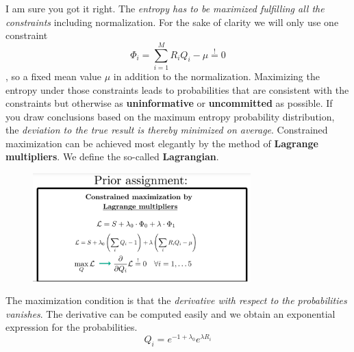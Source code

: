 \documentclass[12pt, a4paper]{scrartcl}
\begin{document}
I am sure you got it right. The \textit{entropy has to be maximized fulﬁlling
all the constraints} including normalization. For the sake of clarity we
will only use one constraint \[\Phi_i=\sum_{i=1}^MR_iQ_i-\mu\stackrel{!}{=}0\], so a fixed mean value $\mu$ in addition to the normalization. 
Maximizing the entropy under those constraints leads to probabilities
that are consistent with the constraints but otherwise as \textbf{uninformative} or
\textbf{uncommitted} as possible. If you draw conclusions based on the maximum
entropy probability distribution, the \textit{deviation to the true result is thereby
minimized on average}.
Constrained maximization can be achieved most elegantly by the method of
\textbf{Lagrange multipliers}. We deﬁne the so-called \textbf{Lagrangian}.\\%
 \begin{figure}[H]
	\centering
	\includegraphics[width=0.75\textwidth]{6_6.png}
\end{figure}

The maximization condition is that the \textit{derivative with respect to the probabilities vanishes}.
The derivative can be computed easily and we obtain an exponential expression for the probabilities.\\

\begin{equation*}\boxed{Q_i=e^{-1+\lambda_0}e^{\lambda R_i}
}\end{equation*}\\
\end{document}
